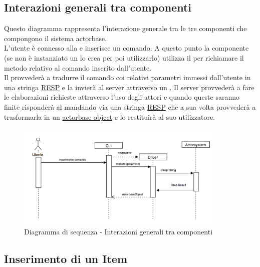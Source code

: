 \documentclass{scalatekids-article}
\begin{document}
\subsection{Interazioni generali tra componenti}
Questo diagramma rappresenta l'interazione generale tra le tre componenti che
compongono il sistema actorbase.\\
L'utente è connesso alla  e inserisce un comando. A questo punto la
componente  (se non è instanziato un  lo crea per poi
utilizzarlo) utilizza il  per richiamare il metodo relativo al
comando inserito dall'utente.\\Il {} provvederà a tradurre il
comando coi relativi parametri immessi dall'utente in una stringa
\hyperref[sec:RESP]{RESP} e la invierà al server attraverso un . Il server provvederà a fare le elaborazioni richieste attraverso l'uso
degli attori e quando queste saranno finite risponderà al 
mandando via  una stringa \hyperref[sec:RESP]{RESP} che a sua
volta provvederà a trasformarla in un
\hyperref[sec:driver::actorbasedata::actorbaseobject]{actorbase object} e lo
restituirà al suo utilizzatore.
\begin{figure}[H]
  \begin{center}
    \includegraphics[width=0.9\textwidth, keepaspectratio]{img/diagrammiSequenza/ScambioMessaggiGenerico.png}
    \caption{Diagramma di sequenza - Interazioni generali tra componenti}
  \end{center}
\end{figure}

\subsection{Inserimento di un Item}
\end{document}

